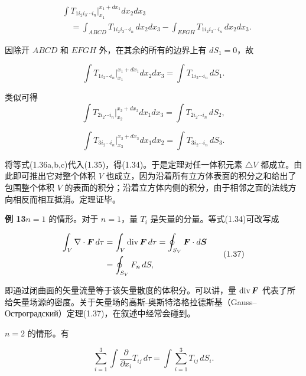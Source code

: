 \begin{equation*}
\begin{aligned}
&\int T_{1 i_2 i_3 \cdots i_n} \Big|_{x_1}^{x_1 + dx_1} dx_2 dx_3\\
&\quad = \int_{ABCD} T_{1 i_2 i_3 \cdots i_n}\, dx_2 dx_3 - \int_{EFGH} T_{1 i_2 i_3 \cdots i_n}\, dx_2 dx_3.
\end{aligned}
\end{equation*}

因除开 $ABCD$ 和 $EFGH$ 外，在其余的所有的边界上有 $dS_1 = 0$，故

\begin{equation}
\int T_{1 i_2 \cdots i_n} \Big|_{x_1}^{x_1 + dx_1} dx_2 dx_3 = \int T_{1 i_2 \cdots i_n}\, dS_1.
\tag{1.36a}
\end{equation}

类似可得
\begin{equation}
\int T_{2 i_2 \cdots i_n} \Big|_{x_2}^{x_2 + dx_2} dx_1 dx_3 = \int T_{2 i_2 \cdots i_n}\, dS_2,
\tag{1.36b}
\end{equation}

\begin{equation}
\int T_{3 i_2 \cdots i_n} \Big|_{x_3}^{x_3 + dx_3} dx_1 dx_2 = \int T_{3 i_2 \cdots i_n}\, dS_3.
\tag{1.36c}
\end{equation}

将等式(1.36a,b,c)代入(1.35)，得(1.34)。于是定理对任一体积元素 $\triangle V$ 都成立。由此即可推出它对整个体积 $V$ 也成立，因为沿着所有立方体表面的积分之和给出了包围整个体积 $V$ 的表面的积分；沿着立方体内侧的积分，由于相邻之面的法线方向相反而相互抵消。定理证毕。

\textbf{例 13}\quad $n = 1$ 的情形。对于 $n = 1$，量 $T_i$ 是矢量的分量。等式(1.34)可改写成

\begin{equation}
\begin{aligned}
\int_{V} \nabla \cdot \bm{F}\, d\tau &= \int_{V} \operatorname{div}\bm{F}\, d\tau = \oint_{S_V} \bm{F} \cdot d\bm{S}\\
&= \oint_{S_V} F_n\, dS,
\end{aligned}
\tag{1.37}
\end{equation}

即通过闭曲面的矢量流量等于该矢量散度的体积分。可以讲，量 $\operatorname{div}\bm{F}$ 代表了所给矢量场源的密度。关于矢量场的高斯-奥斯特洛格拉德斯基（Gauss--Остроградский）定理(1.37)，在叙述中经常会碰到。

$n = 2$ 的情形。有

\begin{equation*}
\sum_{i=1}^{3} \int \frac{\partial}{\partial x_i} T_{ij}\, d\tau = \int \sum_{i=1}^{3} T_{ij}\, dS_i.
\end{equation*}


